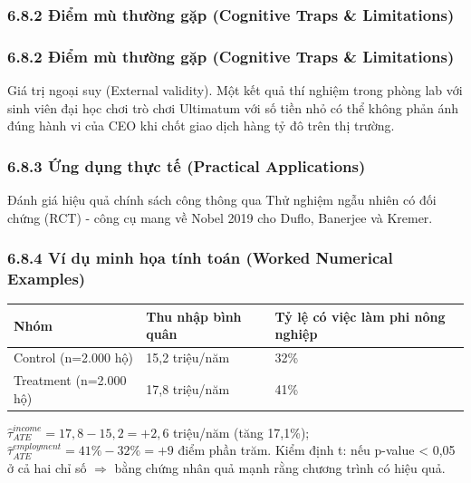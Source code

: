 \documentclass[
]{article}
\newcounter{none} %
\begin{document}
\subsubsection{6.8.2 Điểm mù thường gặp (Cognitive Traps \&
Limitations)}\label{ux111iux1ec3m-muxf9-thux1b0ux1eddng-gux1eb7p-cognitive-traps-limitations-29}

\subsubsection{6.8.2 Điểm mù thường gặp (Cognitive Traps \&
Limitations)}\label{ux111iux1ec3m-muxf9-thux1b0ux1eddng-gux1eb7p-cognitive-traps-limitations-30}

Giá trị ngoại suy (External validity). Một kết quả thí nghiệm trong
phòng lab với sinh viên đại học chơi trò chơi Ultimatum với số tiền nhỏ
có thể không phản ánh đúng hành vi của CEO khi chốt giao dịch hàng tỷ đô
trên thị trường.

\subsubsection{6.8.3 Ứng dụng thực tế (Practical
Applications)}\label{ux1ee9ng-dux1ee5ng-thux1ef1c-tux1ebf-practical-applications-16}

Đánh giá hiệu quả chính sách công thông qua Thử nghiệm ngẫu nhiên có đối
chứng (RCT) - công cụ mang về Nobel 2019 cho Duflo, Banerjee và Kremer.

\subsubsection{6.8.4 Ví dụ minh họa tính toán (Worked Numerical
Examples)}\label{vuxed-dux1ee5-minh-hux1ecda-tuxednh-touxe1n-worked-numerical-examples-15}

{\def\LTcaptype{none} %
\begin{longtable}[]{@{}lll@{}}
\toprule\noalign{}
Nhóm & Thu nhập bình quân & Tỷ lệ có việc làm phi nông nghiệp \\
\midrule\noalign{}
\endhead
\bottomrule\noalign{}
\endlastfoot
Control (n=2.000 hộ) & 15,2 triệu/năm & 32\% \\
Treatment (n=2.000 hộ) & 17,8 triệu/năm & 41\% \\
\end{longtable}
}

\(\hat{\tau}_{ATE}^{income} = 17{,}8 - 15{,}2 = +2{,}6\) triệu/năm (tăng
17,1\%); \(\hat{\tau}_{ATE}^{employment} = 41\% - 32\% = +9\) điểm phần
trăm. Kiểm định t: nếu p-value \textless{} 0,05 ở cả hai chỉ số
\(\Rightarrow\) bằng chứng nhân quả mạnh rằng chương trình có hiệu quả.
\end{document}
